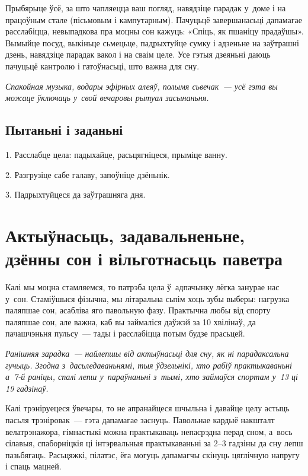 Прыбярыце ўсё, за што чапляецца ваш погляд, навядзіце парадак у~доме і на працоўным стале (пісьмовым і кампутарным). Пачуцьцё завершанасьці дапамагае расслабіцца, невыпадкова пра моцны сон кажуць: «Спіць, як пшаніцу прадаўшы». Вымыйце посуд, выкіньце сьмецьце, падрыхтуйце сумку і адзеньне на заўтрашні дзень, навядзіце парадак вакол і на сваім целе. Усе гэтыя дзеяньні даюць пачуцьцё кантролю і гатоўнасьці, што важна для сну. 

\emph{Спакойная музыка, водары эфірных алеяў, полымя сьвечак~--- усё гэта вы можаце ўключаць у~свой вечаровы рытуал засынаньня.}

\subsection*{Пытаньні і заданьні}

1. Расслабце цела: падыхайце, расьцягніцеся, прыміце ванну.

2. Разгрузіце сабе галаву, запоўніце дзёньнік.

3. Падрыхтуйцеся да заўтрашняга дня.


\section[Актыўнасьць, задавальненьне, дзённы сон і вільготнасьць паветра][Актыўнасьць, задавальненьне і г. д.]{Актыўнасьць, задавальненьне, дзённы сон і вільготнасьць паветра}

Калі мы моцна стамляемся, то патрэба цела ў~адпачынку лёгка занурае нас у~сон. Стаміўшыся фізычна, мы літаральна сьпім хоць зубы выберы: нагрузка паляпшае сон, асабліва яго павольную фазу. Практычна любы від спорту паляпшае сон, але важна, каб вы займаліся даўжэй за 10 хвілінаў, да пачашчэньня пульсу~--- тады і расслабіцца потым будзе прасьцей.

\emph{Ранішняя зарадка~--- найлепшы від актыўнасьці для сну, як ні парадаксальна гучыць. Згодна з~дасьледаваньнямі, тыя ўдзельнікі, хто рабіў практыкаваньні а~7-й раніцы, спалі лепш у~параўнаньні з~тымі, хто займаўся спортам у~13 ці 19 гадзінаў.}

Калі трэніруецеся ўвечары, то не апранайцеся шчыльна і давайце целу астыць пасьля трэніровак~--- гэта дапамагае заснуць. Павольнае кардыё накшталт велатрэнажора, гімнастыкі можна практыкаваць непасрэдна перад сном, а~вось сілавыя, спаборніцкія ці інтэрвальныя практыкаваньні за 2--3 гадзіны да сну лепш пазьбягаць. Расьцяжкі, пілатэс, ёга могуць дапамагчы скінуць цяглічную напругу і спаць мацней.

